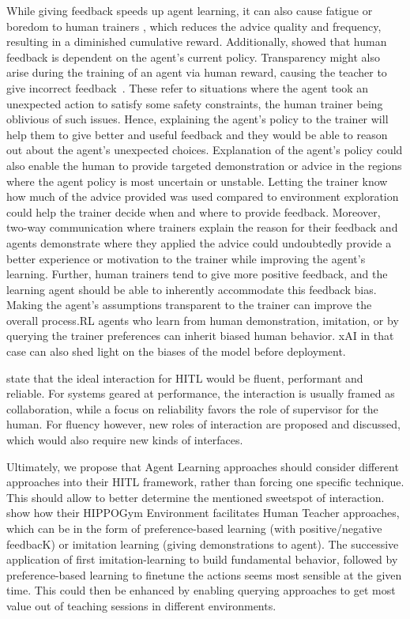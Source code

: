\documentclass[twoside,11pt]{article}
\begin{document}
While giving feedback speeds up agent learning, it can also cause fatigue or boredom to human trainers \citep{akalin:21}, which reduces the advice quality and frequency, resulting in a diminished cumulative reward. Additionally, \cite{macglashan2017interactive} showed that human feedback is dependent on the agent’s current policy.  Transparency might also arise during the training of an agent via human reward, causing the teacher to give incorrect feedback~\citep{knox:13}. These refer to situations where the agent took an unexpected action to satisfy some safety constraints, the human trainer being oblivious of such issues. Hence, explaining the agent’s policy to the trainer will help them to give better and useful feedback and they would be able to reason out about the agent’s unexpected choices. Explanation of the agent’s policy could also enable the human to provide targeted demonstration or advice in the regions where the agent policy is most uncertain or unstable.  Letting the trainer know how much of the advice provided was used compared to environment exploration could help the trainer decide when and where to provide feedback. Moreover, two-way communication where trainers explain the reason for their feedback and agents demonstrate where they applied the advice could undoubtedly provide a better experience or motivation to the trainer while improving the agent’s learning. Further, human trainers tend to give more positive feedback, and the learning agent should be able to inherently accommodate this feedback bias. Making the agent's assumptions transparent to the trainer can improve the overall process.RL agents who learn from human demonstration, imitation, or by querying the trainer preferences can inherit biased human behavior. xAI in that case can also shed light on the biases of the model before deployment.

\citet{WuEtAl:2021:HITLMLSurvey} state that the ideal interaction for HITL would be fluent, performant and reliable. For systems geared at performance, the interaction is usually framed as collaboration, while a focus on reliability favors the role of supervisor for the human. For fluency however, new roles of interaction are proposed and discussed, which would also require new kinds of interfaces.

Ultimately, we propose that Agent Learning approaches should consider different approaches into their HITL framework, rather than forcing one specific technique. This should allow to better determine the mentioned sweetspot of interaction. \citep{WuEtAl:2021:HITLMLSurvey} show how their HIPPOGym Environment facilitates Human Teacher approaches, which can be in the form of preference-based learning (with positive/negative feedbacK) or imitation learning (giving demonstrations to agent). The successive application of first imitation-learning to build fundamental behavior, followed by preference-based learning to finetune the actions seems most sensible at the given time. This could then be enhanced by enabling querying approaches to get most value out of teaching sessions in different environments.
\end{document}
